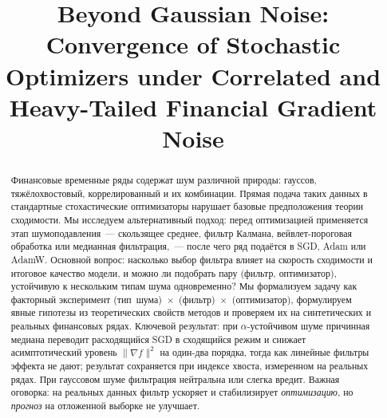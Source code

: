 \documentclass[conference]{IEEEtran}
\begin{document}
\title{Beyond Gaussian Noise: Convergence of Stochastic Optimizers under Correlated and Heavy-Tailed Financial Gradient Noise}

\author{%
\and
{}
\and
{}
\and
{}
}

\maketitle

\begin{abstract}
Финансовые временные ряды содержат шум различной природы: гауссов,
тяжёлохвостовый, коррелированный и их комбинации. Прямая подача таких
данных в стандартные стохастические оптимизаторы нарушает базовые
предположения теории сходимости. Мы исследуем альтернативный подход:
перед оптимизацией применяется этап шумоподавления~--- скользящее среднее,
фильтр Калмана, вейвлет-пороговая обработка или медианная фильтрация,~---
после чего ряд подаётся в SGD, Adam или AdamW. Основной вопрос: насколько
выбор фильтра влияет на скорость сходимости и итоговое качество модели,
и можно ли подобрать пару (фильтр, оптимизатор), устойчивую к нескольким
типам шума одновременно? Мы формализуем задачу как факторный эксперимент
(тип~шума)~$\times$~(фильтр)~$\times$~(оптимизатор), формулируем явные
гипотезы из теоретических свойств методов и проверяем их на синтетических
и реальных финансовых рядах. Ключевой результат: при $\alpha$-устойчивом
шуме причинная медиана переводит расходящийся SGD в сходящийся режим и снижает
асимптотический уровень $\|\nabla f\|^2$ на один-два порядка, тогда как линейные
фильтры эффекта не дают; результат сохраняется при индексе хвоста, измеренном на
реальных рядах. При гауссовом шуме фильтрация нейтральна или слегка вредит.
Важная оговорка: на реальных данных фильтр ускоряет и стабилизирует
\emph{оптимизацию}, но \emph{прогноз} на отложенной выборке не улучшает.
\end{abstract}
\end{document}
